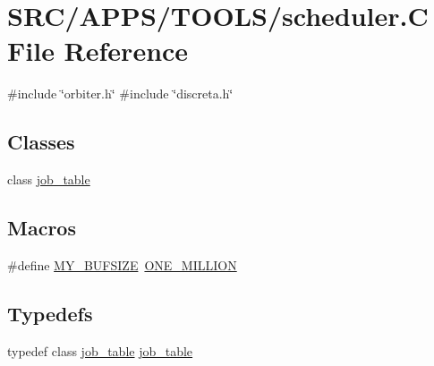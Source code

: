 \hypertarget{scheduler_8_c}{}\section{S\+R\+C/\+A\+P\+P\+S/\+T\+O\+O\+L\+S/scheduler.C File Reference}
\label{scheduler_8_c}
{\ttfamily \#include \char`\"{}orbiter.\+h\char`\"{}}\newline
{\ttfamily \#include \char`\"{}discreta.\+h\char`\"{}}\newline
\subsection*{Classes}
\begin{DoxyCompactItemize}
\item 
class \mbox{\hyperlink{classjob__table}{job\+\_\+table}}
\end{DoxyCompactItemize}
\subsection*{Macros}
\begin{DoxyCompactItemize}
\item 
\#define \mbox{\hyperlink{scheduler_8_c_a6079b3b36c54787d2dca2de2fb2c96df}{M\+Y\+\_\+\+B\+U\+F\+S\+I\+ZE}}~\mbox{\hyperlink{galois_8h_a6a146c1b2155b03eb2ffa3f4ba755034}{O\+N\+E\+\_\+\+M\+I\+L\+L\+I\+ON}}
\end{DoxyCompactItemize}
\subsection*{Typedefs}
\begin{DoxyCompactItemize}
\item 
typedef class \mbox{\hyperlink{classjob__table}{job\+\_\+table}} \mbox{\hyperlink{scheduler_8_c_a230460f79db29f24f2aa40cadf07a218}{job\+\_\+table}}
\end{DoxyCompactItemize}
